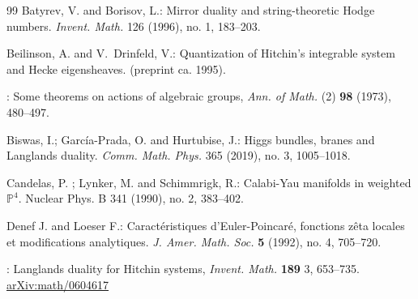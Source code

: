 \documentclass[12pt]{article}
\numberwithin{equation}{section}
\theoremstyle{remark}
\numberwithin{theorem}{section}
\numberwithin{equation}{section}
\begin{document}
\begin{thebibliography}{99}
 Batyrev, V. {\rm and} Borisov, L.:
Mirror duality and string-theoretic Hodge numbers. {\em Invent. Math. }126 (1996), no. 1, 183--203.
	
	{ Beilinson, A. {\rm and }V.~Drinfeld, V.}:
	\newblock Quantization of {H}itchin's integrable system and {H}ecke
	eigensheaves.
	\newblock (preprint ca. 1995).
	
	
	
	:
	Some theorems on actions of algebraic groups,
	{\em Ann. of Math.} ({2}) {\bf 98} (1973), 480--497.
	
	 Biswas, I.; García-Prada, O. {\rm and} Hurtubise, J.:
Higgs bundles, branes and Langlands duality. 
{\em Comm. Math. Phys.} 365 (2019), no. 3, 1005--1018.
	
Candelas, P. ; Lynker, M. {\rm and}  Schimmrigk, R.: Calabi-Yau manifolds in weighted ${\mathbb P}^4$. Nuclear Phys. B 341 (1990), no. 2, 383--402.
	
	 Denef J. {\rm and} Loeser F.: Caract\'eristiques d'Euler-Poincar\'e, fonctions z\^{e}ta locales et modifications analytiques. {\em J. Amer. Math. Soc.} {\bf 5} (1992), no. 4, 705--720.
	
	: Langlands duality for Hitchin systems, {\em Invent. Math.} {\bf 189} 3, 653--735. \href{http://arxiv.org/abs/math/0604617}{arXiv:math/0604617}
	
	
	
	
	
	
	

\end{thebibliography}
\end{document}
